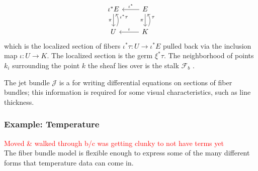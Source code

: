 \documentclass[../main.tex]{subfiles}
\begin{document}
\begin{equation}
    \label{eq:sheaf}
    \begin{tikzcd}
        \iota^*E \arrow[d, "\pi"']           & E \arrow[d, "\pi"'] \arrow[l, "\iota^*"']         \\
        U \arrow[u, "\iota^*\tau"', bend right] & K \arrow[u, "\tau"', bend right] \arrow[l, "\iota"']
        \end{tikzcd}
\end{equation}
which is the localized section of fibers $\iota^*\tau: U \rightarrow \iota^*E$ pulled back via the inclusion map $\iota: U \rightarrow K$. The localized section is the germ $\xi^*\tau$. The neighborhood of points $k_i$ surrounding the point $k$ the sheaf lies over is the stalk $\mathcal{F}_b$ \cite{StalkSheaf2019,spanier1989algebraic}.

The jet bundle $\mathcal{J}$ \cite{JetBundle2020,musilovaCalculusVariationsJet2016} is a for writing differential equations on sections of fiber bundles; this information is required for some visual characteristics, such as line thickness. 

\subsubsection{Example: Temperature}
\textcolor{red}{Moved \& walked through b/c was getting clunky to not have terms yet}\\


The fiber bundle model is flexible enough to express some of the many different forms that temperature data can come in. 
\end{document}
